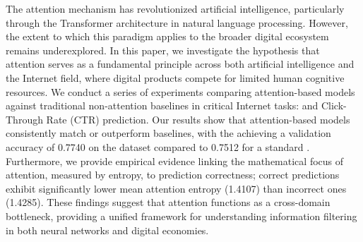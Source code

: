 The attention mechanism has revolutionized artificial intelligence, particularly through the Transformer architecture in natural language processing. However, the extent to which this paradigm applies to the broader digital ecosystem remains underexplored. In this paper, we investigate the hypothesis that attention serves as a fundamental principle across both artificial intelligence and the Internet field, where digital products compete for limited human cognitive resources. We conduct a series of experiments comparing attention-based models against traditional non-attention baselines in critical Internet tasks: \sectask and Click-Through Rate (CTR) prediction. Our results show that attention-based models consistently match or outperform baselines, with the \attentionmlp achieving a validation accuracy of 0.7740 on the \criteo dataset compared to 0.7512 for a standard \mlp. Furthermore, we provide empirical evidence linking the mathematical focus of attention, measured by entropy, to prediction correctness; correct predictions exhibit significantly lower mean attention entropy (1.4107) than incorrect ones (1.4285). These findings suggest that attention functions as a cross-domain bottleneck, providing a unified framework for understanding information filtering in both neural networks and digital economies.
